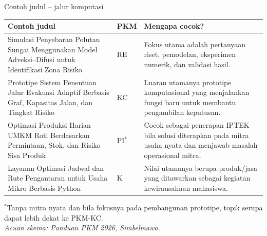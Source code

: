 \documentclass[aspectratio=169,11pt]{beamer}
\begin{document}
\begin{frame}{Contoh judul -- jalur komputasi}
\scriptsize
\renewcommand{\arraystretch}{1.22}
\begin{tabularx}{\textwidth}{>{\raggedright\arraybackslash}p{5.8cm} >{\centering\arraybackslash}p{1.45cm} X}
\toprule
\textbf{Contoh judul} & \textbf{PKM} & \textbf{Mengapa cocok?}\\
\midrule
Simulasi Penyebaran Polutan Sungai Menggunakan Model Adveksi--Difusi untuk Identifikasi Zona Risiko & RE & Fokus utama adalah pertanyaan riset, pemodelan, eksperimen numerik, dan validasi hasil.\\
\addlinespace
Prototipe Sistem Penentuan Jalur Evakuasi Adaptif Berbasis Graf, Kapasitas Jalan, dan Tingkat Risiko & KC & Luaran utamanya prototipe komputasional yang menjalankan fungsi baru untuk membantu pengambilan keputusan.\\
\addlinespace
Optimasi Produksi Harian UMKM Roti Berdasarkan Permintaan, Stok, dan Risiko Sisa Produk & PI$^*$ & Cocok sebagai penerapan IPTEK bila solusi diterapkan pada mitra usaha nyata dan menjawab masalah operasional mitra.\\
\addlinespace
Layanan Optimasi Jadwal dan Rute Pengantaran untuk Usaha Mikro Berbasis Python & K & Nilai utamanya berupa produk/jasa yang ditawarkan sebagai kegiatan kewirausahaan mahasiswa.\\
\bottomrule
\end{tabularx}
\vspace{1mm}
\footnotesize $^*$Tanpa mitra nyata dan bila fokusnya pada pembangunan prototipe, topik serupa dapat lebih dekat ke PKM-KC.\\[-1mm]
\scriptsize\textit{Acuan skema: Panduan PKM 2026, Simbelmawa.}
\end{frame}
\end{document}
